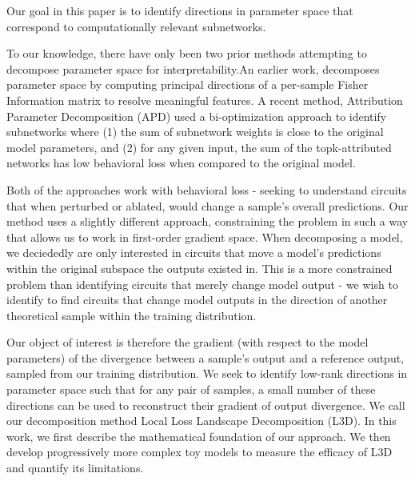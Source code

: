\documentclass{article}
\theoremstyle{plain}
\theoremstyle{definition}
\theoremstyle{remark}
\begin{document}
Our goal in this paper is to identify directions in parameter space that correspond to computationally relevant subnetworks. 

To our knowledge, there have only been two prior methods attempting to decompose parameter space for interpretability.An earlier work\cite{matena2023npeff},  decomposes parameter space by computing principal directions of a per-sample Fisher Information matrix to resolve meaningful features.  A recent method, Attribution Parameter Decomposition (APD) \cite{braun2025interpretability} used a bi-optimization approach to identify subnetworks where (1) the sum of subnetwork weights is close to the original model parameters, and (2) for any given input, the sum of the topk-attributed networks has low behavioral loss when compared to the original model.  

Both of the approaches work with behavioral loss - seeking to understand circuits that when perturbed or ablated, would change a sample's overall predictions. Our method uses a slightly different approach, constraining the problem in such a way that allows us to work in first-order gradient space. When decomposing a model, we deciededly are only interested in circuits that move a model's predictions within the original subspace the outputs existed in. This is a more constrained problem than identifying circuits that merely change model output - we wish to identify to find circuits that change model outputs in the direction of another theoretical sample within the training distribution. 

Our object of interest is therefore the gradient (with respect to the model parameters) of the divergence between a sample's output and a reference output, sampled from our training distribution. We seek to identify low-rank directions in parameter space such that for any pair of samples, a small number of these directions can be used to reconstruct their gradient of output divergence. We call our decomposition method Local Loss Landscape Decomposition (L3D). In this work, we first describe the mathematical foundation of our approach. We then develop progressively more complex toy models to measure the efficacy of L3D and quantify its limitations. 



\end{document}
